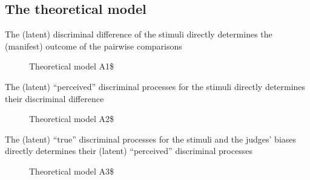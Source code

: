 \documentclass[
  authoryear,
  preprint,
  1p]{elsarticle}
\begin{document}
\subsection{The theoretical model}\label{sec-theory-theoretical}

The (latent) discriminal difference of the stimuli directly determines
the (manifest) outcome of the pairwise comparisons

\begin{figure}


\caption{\label{fig-CJ_TM_A1}Theoretical model A1\$}

\end{figure}%

The (latent) ``perceived'' discriminal processes for the stimuli
directly determines their discriminal difference

\begin{figure}


\caption{\label{fig-CJ_TM_A2}Theoretical model A2\$}

\end{figure}%

The (latent) ``true'' discriminal processes for the stimuli and the
judges' biases directly determines their (latent) ``perceived''
discriminal processes

\begin{figure}


\caption{\label{fig-CJ_TM_A3}Theoretical model A3\$}

\end{figure}%
\end{document}
